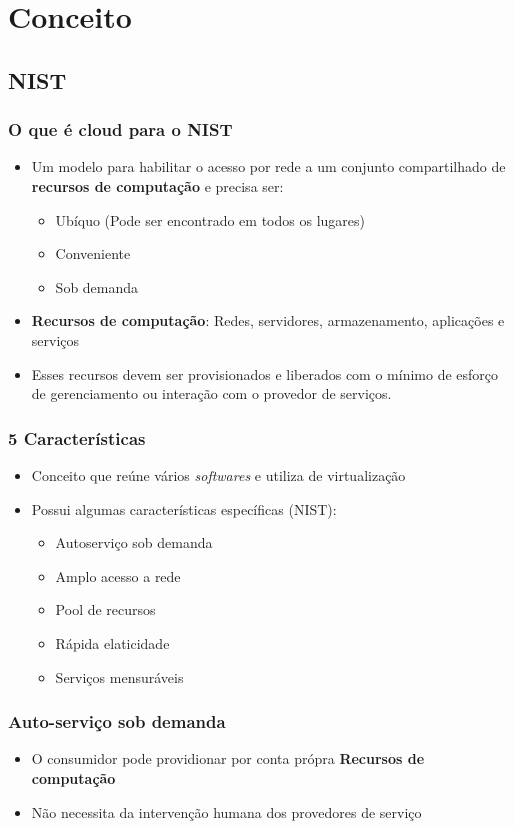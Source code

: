 \section{Conceito}

\subsection{NIST}

\begin{frame}
	\frametitle{O que é cloud para o NIST}
	\begin{itemize}
		\item Um modelo para habilitar o acesso por rede a um conjunto compartilhado de \textbf{recursos de computação} e precisa ser:
			\begin{itemize}
				\item Ubíquo (Pode ser encontrado em todos os lugares)
				\item Conveniente
				\item Sob demanda
			\end{itemize}
		\item \textbf{Recursos de computação}: Redes, servidores, armazenamento, aplicações e serviços
		\item Esses recursos devem ser provisionados e liberados com o mínimo de esforço de gerenciamento ou interação com o provedor de serviços.
	\end{itemize}
\end{frame}

\begin{frame}
	\frametitle{5 Características}
	\begin{itemize}
		\item Conceito que reúne vários \textit{softwares} e utiliza de virtualização
		\item Possui algumas características específicas (NIST):
			\begin{itemize}
				\item Autoserviço sob demanda
				\item Amplo acesso a rede
				\item Pool de recursos
				\item Rápida elaticidade
				\item Serviços mensuráveis
			\end{itemize}
	\end{itemize}
\end{frame}

\begin{frame}
	\frametitle{Auto-serviço sob demanda}
	\begin{itemize}
		\item O consumidor pode providionar por conta própra \textbf{Recursos de computação}
		\item Não necessita da intervenção humana dos provedores de serviço
	\end{itemize}
\end{frame}

